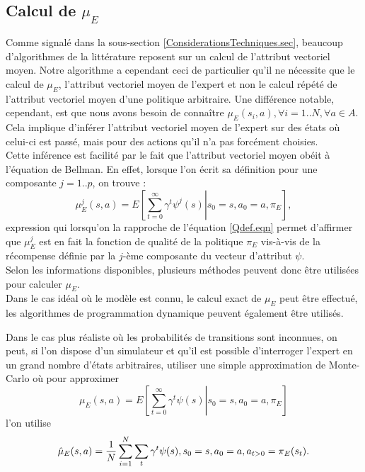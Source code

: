 \documentclass[publibook-draft]{CAp2012}
\begin{document}
\subsection{Calcul de $\mu_E$}
\label{calculmu.sec}
Comme signalé dans la sous-section \ref{ConsiderationsTechniques.sec}, beaucoup d'algorithmes de la littérature reposent sur un calcul de l'attribut vectoriel moyen. Notre algorithme a cependant ceci de particulier qu'il ne nécessite que le calcul de $\mu_E$, l'attribut vectoriel moyen de l'expert et non le calcul répété de l'attribut vectoriel moyen d'une politique arbitraire. Une différence notable, cependant, est que nous avons besoin de connaître $\mu_E(s_i,a), \forall i= 1..N,\forall a \in A$. Cela implique d'inférer l'attribut vectoriel moyen de l'expert sur des états où celui-ci est passé, mais pour des actions qu'il n'a pas forcément choisies.\\ %

Cette inférence est facilité par le fait que l'attribut vectoriel moyen obéit à l'équation de Bellman. En effet, lorsque l'on écrit sa définition pour une composante $j=1..p$, on trouve :
\begin{equation}
\mu_E^j(s,a) = E\left.\left[\sum\limits_{t=0}^\infty \gamma^t \psi^j(s)\right|s_0 = s, a_0 = a, \pi_E\right],
\end{equation}
expression qui lorsqu'on la rapproche de l'équation \eqref{Qdef.eqn} permet d'affirmer que $\mu^j_E$ est en fait la fonction de qualité de la politique $\pi_E$ vis-à-vis de la récompense définie par la $j$-ème composante du vecteur d'attribut $\psi$.\\

Selon les informations disponibles, plusieurs méthodes peuvent donc être utilisées pour calculer $\mu_E$.\\

Dans le cas idéal où le modèle est connu, le calcul exact de $\mu_E$ peut être effectué, les algorithmes de programmation dynamique peuvent également être utilisés.

Dans le cas plus réaliste où les probabilités de transitions sont inconnues, on peut, si l'on dispose d'un simulateur et qu'il est possible d'interroger l'expert en un grand nombre d'états arbitraires, utiliser une simple approximation de Monte-Carlo où pour approximer
\begin{equation}
\mu_E(s,a) = E\left.\left[\sum\limits_{t=0}^\infty \gamma^t \psi(s)\right|s_0 = s, a_0 = a, \pi_E\right]
\end{equation}
 l'on utilise
\begin{equation}
\hat\mu_E(s,a) = {1\over N}\sum\limits_{i=1}^{N}\sum\limits_{t}\gamma^t\psi(s), s_0=s, a_0=a, a_{t>0} = \pi_E(s_t).
\end{equation}
\end{document}
